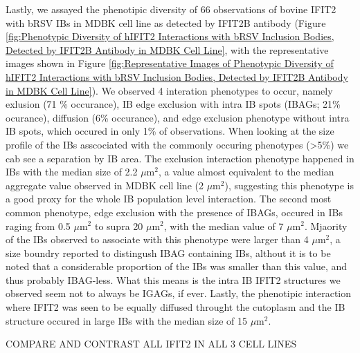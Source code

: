 Lastly, we assayed the phenotipic diversity of 66 observations of bovine IFIT2 with bRSV IBs in MDBK cell line as detected by IFIT2B antibody (Figure \ref{fig:Phenotypic Diversity of hIFIT2 Interactions with bRSV Inclusion Bodies, Detected by IFIT2B Antibody in MDBK Cell Line}, with the representative images shown in Figure \ref{fig:Representative Images of Phenotypic Diversity of hIFIT2 Interactions with bRSV Inclusion Bodies, Detected by IFIT2B Antibody in MDBK Cell Line}). We observed 4 interation phenotypes to occur, namely exlusion (71 \% occurance), IB edge exclusion with intra IB spots (IBAGs; 21\% ocurance), diffusion (6\% occurance), and edge exclusion phenotype without intra IB spots, which occured in only 1\% of observations. When looking at the size profile of the IBs asscociated with the commonly occuring phenotypes (>5\%) we cab see a separation by IB area. The exclusion interaction phenotype happened in IBs with the median size of 2.2 \(\mu \mbox{m}^2\), a value almost equivalent to the median aggregate value observed in MDBK cell line (2 \(\mu \mbox{m}^2\)), suggesting this phenotype is a good proxy for the whole IB population level interaction. The second most common phenotype, edge exclusion with the presence of IBAGs, occured in IBs raging from 0.5 \(\mu \mbox{m}^2\) to supra 20 \(\mu \mbox{m}^2\), with the median value of 7 \(\mu \mbox{m}^2\). Mjaority of the IBs observed to associate with this phenotype were larger than 4 \(\mu \mbox{m}^2\), a size boundry reported to distingush IBAG containing IBs, althout it is to be noted that a considerable proportion of the IBs was smaller than this value, and thus probably IBAG-less. What this means is the intra IB IFIT2 structures we observed seem not to always be IGAGs, if ever. Lastly, the phenotipic interaction where IFIT2 was seen to be equally diffused throught the cutoplasm and the IB structure occured in large IBs with the median size of 15 \(\mu \mbox{m}^2\).

COMPARE AND CONTRAST ALL IFIT2 IN ALL 3 CELL LINES

